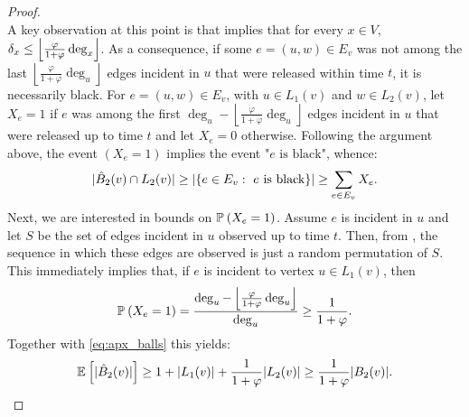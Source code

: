 \begin{proof}
\[\]
A key observation at this point is that  implies that for every $x\in V$, $\delta_x\le\left\lfloor\frac{\varphi}{1 + \varphi}\deg_x\right\rfloor$. As a consequence, if some $e = (u, w)\in E_v$ was not among the last $\left\lfloor\frac{\varphi}{1 + \varphi}\deg_u\right\rfloor$ edges incident in $u$ that were released within time $t$, it is necessarily black. For $e = (u, w)\in E_v$, with $u\in L_1(v)$ and $w\in L_2(v)$, let $X_e = 1$ if $e$ was among the first $\deg_u - \left\lfloor\frac{\varphi}{1 + \varphi}\deg_u\right\rfloor$ edges incident in $u$ that were released up to time $t$ and let $X_e = 0$ otherwise. Following the argument above, the event $( X_e = 1 )$ implies the event $\text{"$e$ is black"}$, whence:
\begin{equation}\label{eq:apx_balls}
    |\hat{B}_2(v)\cap L_2(v)| \ge |\{e\in E_v:\text{ $e$ is black}\}|\ge \sum_{e\in E_v}X_e.
\end{equation}
Next, we are interested in bounds on $\mathbb{P}_{} \left( X_e = 1 \right)$. Assume $e$ is incident in $u$ and let $S$ be the set of edges incident in $u$ observed up to time $t$. 
Then, from , the sequence in which these edges are observed is just a random permutation of $S$. 
This immediately implies that, if $e$ is incident to vertex $u\in L_1(v)$, then  
\[
    \mathbb{P}_{} \left( X_e = 1 \right) = \frac{\deg_u - \left\lfloor\frac{\varphi}{1 + \varphi}\deg_u\right\rfloor}{\deg_u}\ge\frac{1}{1 + \varphi}.
\]
Together with \eqref{eq:apx_balls} this yields:
\[
    \mathbb{E}_{} \left[ |\hat{B}_2(v)| \right]\ge 1 + |L_1(v)| + \frac{1}{1 + \varphi}|L_2(v)| \geq \frac{1}{1+\varphi}\vert B_2(v) \vert.
\]

\end{proof}
